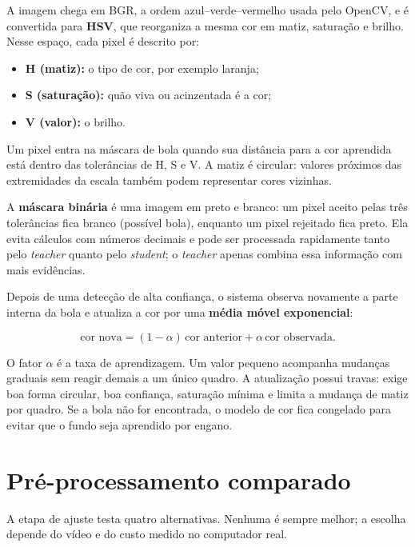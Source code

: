 \documentclass[11pt,a4paper]{article}
\begin{document}
A imagem chega em BGR, a ordem azul--verde--vermelho usada pelo OpenCV, e é convertida para
\textbf{HSV}, que reorganiza a mesma cor em matiz, saturação e brilho. Nesse espaço, cada
pixel é descrito por:

\begin{itemize}
  \item \textbf{H (matiz):} o tipo de cor, por exemplo laranja;
  \item \textbf{S (saturação):} quão viva ou acinzentada é a cor;
  \item \textbf{V (valor):} o brilho.
\end{itemize}

Um pixel entra na máscara de bola quando sua distância para a cor aprendida está dentro das
tolerâncias de H, S e V. A matiz é circular: valores próximos das extremidades da escala
também podem representar cores vizinhas.

A \textbf{máscara binária} é uma imagem em preto e branco: um pixel aceito pelas três
tolerâncias fica branco (possível bola), enquanto um pixel rejeitado fica preto. Ela evita
cálculos com números decimais e pode ser processada rapidamente tanto pelo \textit{teacher}
quanto pelo \textit{student}; o \textit{teacher} apenas combina essa informação com mais evidências.

Depois de uma detecção de alta confiança, o sistema observa novamente a parte interna da
bola e atualiza a cor por uma \textbf{média móvel exponencial}:

\[
  \text{cor nova} = (1-\alpha)\,\text{cor anterior}
  + \alpha\,\text{cor observada}.
\]

O fator $\alpha$ é a taxa de aprendizagem. Um valor pequeno acompanha mudanças graduais
sem reagir demais a um único quadro. A atualização possui travas: exige boa forma circular,
boa confiança, saturação mínima e limita a mudança de matiz por quadro. Se a bola não for
encontrada, o modelo de cor fica congelado para evitar que o fundo seja aprendido por engano.

\section{Pré-processamento comparado}

A etapa de ajuste testa quatro alternativas. Nenhuma é sempre melhor; a escolha depende do
vídeo e do custo medido no computador real.
\end{document}
